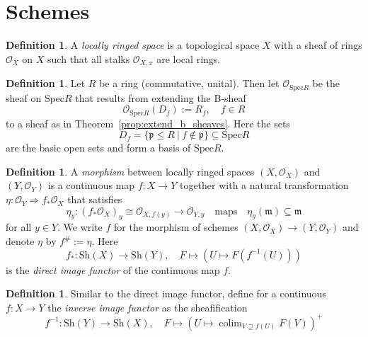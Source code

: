 \documentclass{scrartcl}
\newcommand{\Spec}{\mathrm{Spec}}
\renewcommand{\O}{\mathcal{O}}
\DeclareMathOperator*{\colim}{colim}
\theoremstyle{definition}
\newtheorem{definition}[prop]{Definition}
\begin{document}
\section{Schemes}
\begin{definition}
    A \emph{locally ringed space} is a topological space $X$ with a sheaf of rings $\O_X$ on $X$ such that all stalks $\O_{X, x}$ are local rings.
\end{definition}
\begin{definition}
    Let $R$ be a ring (commutative, unital).
    Then let $\O_{\Spec R}$ be the sheaf on $\Spec R$ that results from extending the B-sheaf
    \begin{equation*}
        \O_{\Spec R}(D_f) := R_f, \quad f \in R
    \end{equation*}
    to a sheaf as in Theorem~\ref{prop:extend_b_sheaves}.
    Here the sets
    \begin{equation*}
        D_f = \{ \mathfrak{p} \leq R \ | \ f \notin \mathfrak{p} \} \subseteq \Spec R
    \end{equation*}
    are the basic open sets and form a basis of $\Spec R$.
\end{definition}
\begin{definition}
    A \emph{morphism} between locally ringed spaces $(X, \O_X)$ and $(Y, \O_Y)$ is a continuous map $f: X \to Y$ together with a natural transformation $\eta: \O_Y \Rightarrow f_*\O_X$ that satisfies
    \begin{equation*}
        \eta_y: (f_*\O_X)_y \cong \O_{X, f(y)} \to \O_{Y, y} \quad \text{maps} \quad \eta_y(\mathfrak{m}) \subseteq \mathfrak{m}
    \end{equation*}
    for all $y \in Y$.
    We write $f$ for the morphism of schemes $(X, \O_X) \to (Y, \O_Y)$ and denote $\eta$ by $f^\# := \eta$.
    Here
    \begin{equation*}
        f_*: \mathrm{Sh}(X) \to \mathrm{Sh}(Y), \quad F \mapsto (U \mapsto F(f^{-1}(U)))
    \end{equation*}
    is the \emph{direct image functor} of the continuous map $f$.
\end{definition}
\begin{definition}
    Similar to the direct image functor, define for a continuous $f: X \to Y$ the \emph{inverse image functor} as the sheafification
    \begin{equation*}
        f^{-1}: \mathrm{Sh}(Y) \to \mathrm{Sh}(X), \quad F \mapsto \left( U \mapsto \colim_{V \supseteq f(U)} F(V) \right)^+
    \end{equation*}
\end{definition}
\end{document}
